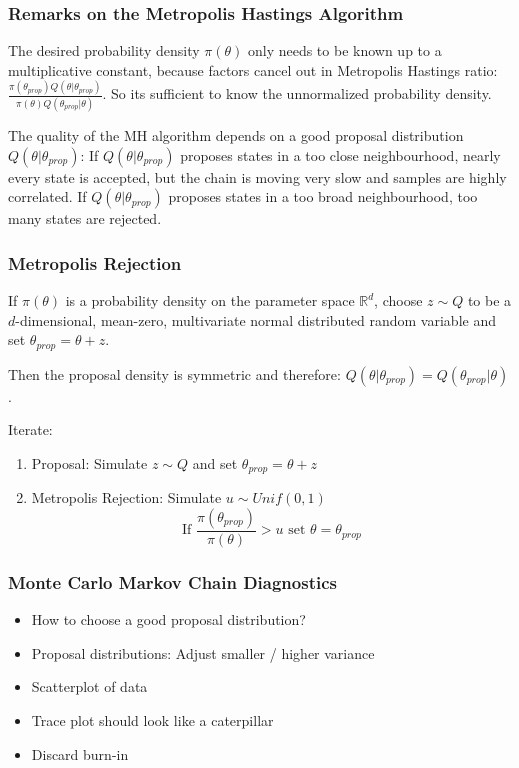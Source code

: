 \documentclass[11pt]{article}
\begin{document}
\subsubsection{Remarks on the Metropolis Hastings Algorithm}
The desired probability density $\pi(\theta)$ only needs to be known up to a multiplicative constant, because factors cancel out in Metropolis Hastings ratio:$\frac{\pi(\theta_{prop})Q(\theta|\theta_{prop} )}{\pi(\theta) Q(\theta_{prop} |\theta)}$. So its sufficient to know the unnormalized probability density.

The quality of the MH algorithm depends on a good proposal distribution $Q(\theta|\theta_{prop})$: If $Q(\theta|\theta_{prop})$ proposes states in a too close neighbourhood, nearly every state is accepted, but the chain is moving very slow and samples are highly correlated. If $Q(\theta|\theta_{prop})$ proposes states in a too broad neighbourhood, too many states are rejected.

\subsubsection{Metropolis Rejection}
If $\pi(\theta)$ is a probability density on the parameter space $\mathbb{R}^d$, choose $z \sim Q$ to be a $d$-dimensional, mean-zero, multivariate normal distributed random variable and set $\theta_{prop} = \theta + z$.

Then the proposal density is symmetric and therefore: $Q(\theta|\theta_{prop} ) = Q(\theta_{prop} |\theta)$.

Iterate:
\begin{enumerate}
	\item Proposal: Simulate $z \sim Q$ and set $\theta_{prop} = \theta + z$
	\item Metropolis Rejection: Simulate $u \sim Unif(0,1)$\\
	$$\text{If }\frac{\pi(\theta_{prop})}{\pi(\theta)}> u\text{ set }\theta = \theta_{prop}$$
\end{enumerate}

\subsubsection{Monte Carlo Markov Chain Diagnostics}

\begin{itemize}
	\item How to choose a good proposal distribution?
	\item Proposal distributions: Adjust smaller / higher variance
	\item Scatterplot of data
	\item Trace plot should look like a caterpillar
	\item Discard burn-in
\end{itemize}
\end{document}
